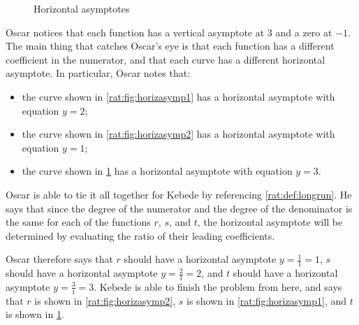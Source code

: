 \begin{pccexample}
\begin{figure}[!htb]
\begin{subfigure}{\figurewidth}
			\caption{}
			\label{rat:fig:horizasymp3}
		\end{subfigure}
		\caption{Horizontal asymptotes}
		\label{rat:fig:horizasymp}
	\end{figure}
	
	Oscar notices that each function has a vertical asymptote at $3$ and a zero at $-1$. 
	The main thing that catches Oscar's eye is that each function has a different 
	coefficient in the numerator, and that each curve has a different horizontal asymptote. 
	In particular, Oscar notes that:
	\begin{itemize}
		\item the curve shown in \cref{rat:fig:horizasymp1} has a horizontal asymptote with equation $y=2$;
		\item the curve shown in \cref{rat:fig:horizasymp2} has a horizontal asymptote with equation $y=1$;
		\item the curve shown in \cref{rat:fig:horizasymp3} has a horizontal asymptote with equation $y=3$.
	\end{itemize}
	Oscar is able to tie it all together for Kebede by referencing \cref{rat:def:longrun}. He says 
	that since the degree of the numerator and the degree of the denominator is the same 
	for each of the functions $r$, $s$, and $t$, the horizontal asymptote will be determined 
	by evaluating the ratio of their leading coefficients. 
	
	Oscar therefore says that $r$ should have a horizontal asymptote $y=\frac{1}{1}=1$, $s$ should 
	have a horizontal asymptote $y=\frac{2}{1}=2$, and $t$ should have a horizontal asymptote 
	$y=\frac{3}{1}=3$. Kebede is able to finish the problem from here, and says that $r$ is 
	shown in \cref{rat:fig:horizasymp2}, $s$ is shown in \cref{rat:fig:horizasymp1}, and 
	$t$ is shown in \cref{rat:fig:horizasymp3}.
\end{pccexample}

